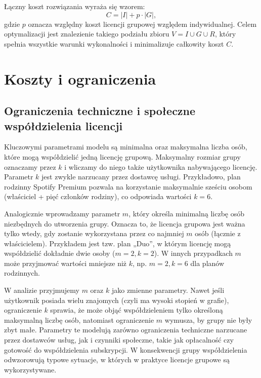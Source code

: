 Łączny koszt rozwiązania wyraża się wzorem:
\[
C = |I| + p \cdot |G|,
\]
gdzie $p$ oznacza względny koszt licencji grupowej względem indywidualnej. Celem optymalizacji jest znalezienie takiego podziału zbioru $V = I \cup G \cup R$, który spełnia wszystkie warunki wykonalności i minimalizuje całkowity koszt $C$.


\section{Koszty i ograniczenia}

\subsection{Ograniczenia techniczne i społeczne współdzielenia licencji}

Kluczowymi parametrami modelu są minimalna oraz maksymalna liczba osób, które mogą współdzielić jedną licencję grupową. Maksymalny rozmiar grupy oznaczamy przez $k$ i wliczamy do niego także użytkownika nabywającego licencję. Parametr $k$ jest zwykle narzucany przez dostawcę usługi. Przykładowo, plan rodzinny Spotify Premium pozwala na korzystanie maksymalnie sześciu osobom (właściciel + pięć członków rodziny), co odpowiada wartości $k=6$.

Analogicznie wprowadzamy parametr $m$, który określa minimalną liczbę osób niezbędnych do utworzenia grupy. Oznacza to, że licencja grupowa jest ważna tylko wtedy, gdy zostanie wykorzystana przez co najmniej $m$ osób (łącznie z właścicielem). Przykładem jest tzw. plan „Duo”, w którym licencję mogą współdzielić dokładnie dwie osoby ($m=2, k=2$). W innych przypadkach $m$ może przyjmować wartości mniejsze niż $k$, np. $m=2, k=6$ dla planów rodzinnych.

W analizie przyjmujemy $m$ oraz $k$ jako zmienne parametry. Nawet jeśli użytkownik posiada wielu znajomych (czyli ma wysoki stopień w grafie), ograniczenie $k$ sprawia, że może objąć współdzieleniem tylko określoną maksymalną liczbę osób, natomiast ograniczenie $m$ wymusza, by grupy nie były zbyt małe. Parametry te modelują zarówno ograniczenia techniczne narzucane przez dostawców usług, jak i czynniki społeczne, takie jak opłacalność czy gotowość do współdzielenia subskrypcji. W konsekwencji grupy współdzielenia odwzorowują typowe sytuacje, w których w praktyce licencje grupowe są wykorzystywane.



